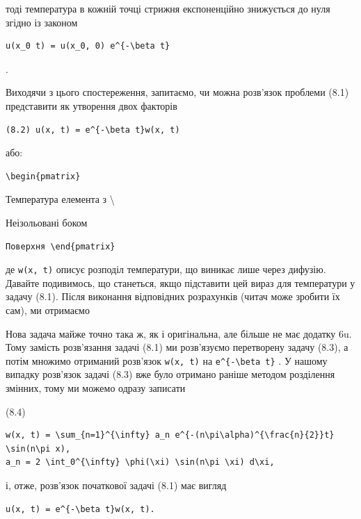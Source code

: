 \documentclass[
  ukrainian,
]{article}
\begin{document}
тоді температура в кожній точці стрижня експоненційно знижується до нуля
згідно із законом

\begin{verbatim}
u(x_0 t) = u(x_0, 0) e^{-\beta t}
\end{verbatim}

.

Виходячи з цього спостереження, запитаємо, чи можна розв'язок проблеми
(8.1) представити як утворення двох факторів

\begin{verbatim}
(8.2) u(x, t) = e^{-\beta t}w(x, t)
\end{verbatim}

або:

\begin{verbatim}
\begin{pmatrix}
\end{verbatim}

Температура елемента з \textbackslash{}

Неізольовані боком

\begin{verbatim}
Поверхня \end{pmatrix}
\end{verbatim}

де \texttt{w(x,\ t)} описує розподіл температури, що виникає лише через
дифузію. Давайте подивимось, що станеться, якщо підставити цей вираз для
температури у задачу (8.1). Після виконання відповідних розрахунків
(читач може зробити їх сам), ми отримаємо

Нова задача майже точно така ж, як і оригінальна, але більше не має
додатку 6u. Тому замість розв'язання задачі (8.1) ми розв'язуємо
перетворену задачу (8.3), а потім множимо отриманий розв'язок
\texttt{w(x,\ t)} на \texttt{e\^{}\{-\textbackslash{}beta\ t\}} . У
нашому випадку розв'язок задачі (8.3) вже було отримано раніше методом
розділення змінних, тому ми можемо одразу записати

(8.4)

\begin{verbatim}
w(x, t) = \sum_{n=1}^{\infty} a_n e^{-(n\pi\alpha)^{\frac{n}{2}}t} \sin(n\pi x),
a_n = 2 \int_0^{\infty} \phi(\xi) \sin(n\pi \xi) d\xi,
\end{verbatim}

і, отже, розв'язок початкової задачі (8.1) має вигляд

\begin{verbatim}
u(x, t) = e^{-\beta t}w(x, t).
\end{verbatim}
\end{document}
